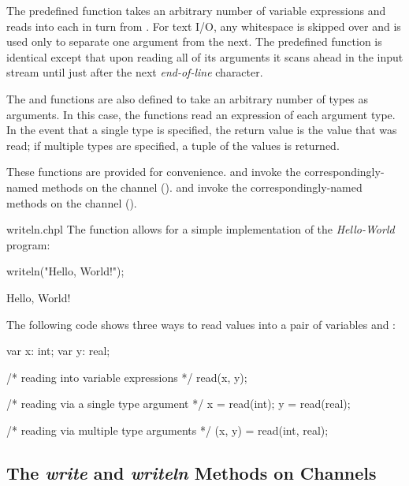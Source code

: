 The predefined function  takes an arbitrary number of
variable expressions and reads into each in turn from .
For text I/O, any whitespace is skipped over and is used only to separate one
argument from the next.  The predefined function  is
identical except that upon reading all of its arguments it scans ahead
in the input stream until just after the next {\em end-of-line}
character.

The  and  functions are also defined to take
an arbitrary number of types as arguments.  In this case, the
functions read an expression of each argument type.  In the event that
a single type is specified, the return value is the value that was
read; if multiple types are specified, a tuple of the values is
returned.

These functions are provided for convenience.
 and  invoke the correspondingly-named methods
on the  channel ().
 and  invoke the correspondingly-named methods
on the  channel ().

\begin{chapelexample}{writeln.chpl}
The  function allows for a simple implementation
of the {\em Hello-World} program:
\begin{chapel}
writeln("Hello, World!");
\end{chapel}
\begin{chapelprintoutput}
Hello, World!
\end{chapelprintoutput}
\end{chapelexample}

\begin{example}
The following code shows three ways to read values into a pair of
variables  and :
\begin{chapel}
var x: int;
var y: real;

/* reading into variable expressions */
read(x, y);

/* reading via a single type argument */
x = read(int);
y = read(real);

/* reading via multiple type arguments */
(x, y) = read(int, real);
\end{chapel}
\end{example}

\label{User_Defined_writeThis_Methods}

\subsection{The {\em write} and {\em writeln} Methods on Channels}
\label{IO_channel_write}

